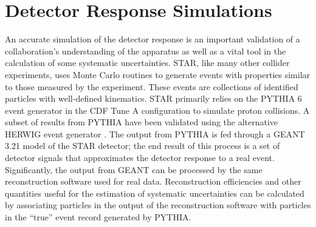 \section{Detector Response Simulations}

An accurate simulation of the detector response is an important validation of
a collaboration's understanding of the apparatus as well as a vital tool in
the calculation of some systematic uncertainties. STAR, like many other
collider experiments, uses Monte Carlo routines to generate events with
properties similar to those measured by the experiment. These events are
collections of identified particles with well-defined kinematics. STAR
primarily relies on the PYTHIA 6 event generator \cite{Sjostrand:2006za} in
the CDF Tune A \cite{Field:2005sa} configuration to simulate proton
collisions. A subset of results from PYTHIA have been validated using the
alternative HERWIG event generator \cite{Corcella:2000bw}. The output from
PYTHIA is fed through a GEANT 3.21 \cite{GEANT321} model of the STAR detector;
the end result of this process is a set of detector signals that approximates
the detector response to a real event. Significantly, the output from GEANT
can be processed by the same reconstruction software used for real data.
Reconstruction efficiencies and other quantities useful for the estimation of
systematic uncertainties can be calculated by associating particles in the
output of the reconstruction software with particles in the ``true'' event
record generated by PYTHIA.

